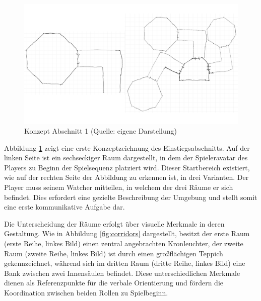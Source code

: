 \begin{figure}[ht]
\centering
\includegraphics[width=1\linewidth]{content/pictures/Abschnitt_Concept_00.png}
\caption{Konzept Abschnitt 1 (Quelle: eigene Darstellung)}
\label{fig:section_00_concept}
\end{figure}


Abbildung \ref{fig:section_00_concept} zeigt eine erste Konzeptzeichnung des Einstiegsabschnitts. Auf der linken Seite ist ein sechseckiger Raum dargestellt, in dem der Spieleravatar des Players zu Beginn der Spielsequenz platziert wird. Dieser Startbereich existiert, wie auf der rechten Seite der Abbildung zu erkennen ist, in drei Varianten. Der Player muss seinem Watcher mitteilen, in welchem der drei Räume er sich befindet. Dies erfordert eine gezielte Beschreibung der Umgebung und stellt somit eine erste kommunikative Aufgabe dar.

Die Unterscheidung der Räume erfolgt über visuelle Merkmale in deren Gestaltung. Wie in Abbildung \ref{fig:corridors} dargestellt, besitzt der erste Raum (erste Reihe, linkes Bild) einen zentral angebrachten Kronleuchter, der zweite Raum (zweite Reihe, linkes Bild) ist durch einen großflächigen Teppich gekennzeichnet, während sich im dritten Raum (dritte Reihe, linkes Bild) eine Bank zwischen zwei Innensäulen befindet. Diese unterschiedlichen Merkmale dienen als Referenzpunkte für die verbale Orientierung und fördern die Koordination zwischen beiden Rollen zu Spielbeginn.

